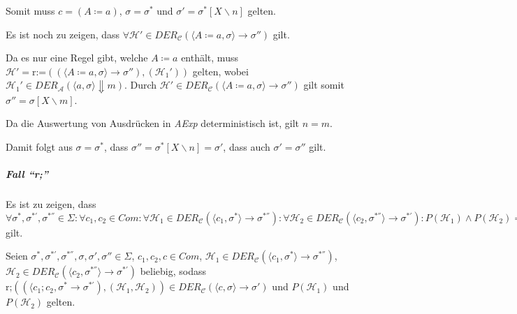 																	Somit muss $ c = (A \coloneqq a) $, $ \sigma = \sigma ^ * $ und $ \sigma' = \sigma ^ * [X \backslash n] $ gelten.

																	Es ist noch zu zeigen, dass $ \forall \mathcal{H}' \in \textit{DER} _ \mathcal{C} (\langle A \coloneqq a, \sigma \rangle \rightarrow \sigma'') $ gilt.

																	Da es nur eine Regel gibt, welche $ A \coloneqq a $ enthält, muss $ \mathcal{H}' = \text{r:=}((\langle A \coloneqq a, \sigma \rangle \rightarrow \sigma''), (\mathcal{H} _ 1 ')) $ gelten, wobei $ \mathcal{H} _ 1 ' \in \textit{DER} _ \mathcal{A} (\langle a, \sigma \rangle \Downarrow m) $. Durch $ \mathcal{H}' \in \textit{DER} _ \mathcal{C} (\langle A \coloneqq a, \sigma \rangle \rightarrow \sigma'') $ gilt somit $ \sigma'' = \sigma[X \backslash m] $.

																	Da die Auswertung von Ausdrücken in \textit{AExp} deterministisch ist, gilt $ n = m $.

																	Damit folgt aus $ \sigma = \sigma ^ * $, dass $ \sigma'' = \sigma ^ * [X \backslash n] = \sigma' $, dass auch $ \sigma' = \sigma'' $ gilt.

																\subparagraph{Fall \enquote{r;}}
																	Es ist zu zeigen, dass $ \forall \sigma ^ *, \sigma ^ {*'}, \sigma ^ {*''} \in \Sigma : \forall c _ 1, c _ 2 \in \textit{Com} : \forall \mathcal{H} _ 1 \in \textit{DER} _ \mathcal{C} (\langle c _ 1, \sigma ^ * \rangle \rightarrow \sigma ^ {*''}) : \forall \mathcal{H} _ 2 \in \textit{DER} _ \mathcal{C} (\langle c _ 2, \sigma ^ {*''} \rangle \rightarrow \sigma ^ {*'}) : P(\mathcal{H} _ 1) \land P(\mathcal{H} _ 2) \implies P(\text{r;}((\langle c _ 1 ; c _ 2, \sigma ^ * \rangle \rightarrow \sigma ^ {*'}), (\mathcal{H} _ 1, \mathcal{H} _ 2))) $ gilt.

																	Seien $ \sigma ^ *, \sigma ^ {*'}, \sigma ^ {*''}, \sigma, \sigma', \sigma'' \in \Sigma $, $ c _ 1, c _ 2, c \in \textit{Com} $, $ \mathcal{H} _ 1 \in \textit{DER} _ \mathcal{C} (\langle c _ 1, \sigma ^ * \rangle \rightarrow \sigma ^ {*''}) $, $ \mathcal{H} _ 2 \in \textit{DER} _ \mathcal{C} (\langle c _ 2, \sigma ^ {*''} \rangle \rightarrow \sigma ^ {*'}) $ beliebig, sodass $ \text{r;}((\langle c _ 1 ; c _ 2, \sigma ^ * \rightarrow \sigma ^ {*'}), (\mathcal{H} _ 1, \mathcal{H} _ 2)) \in \textit{DER} _ \mathcal{C} (\langle c, \sigma \rangle \rightarrow \sigma') $ und $ P(\mathcal{H} _ 1) $ und $ P(\mathcal{H} _ 2) $ gelten.


